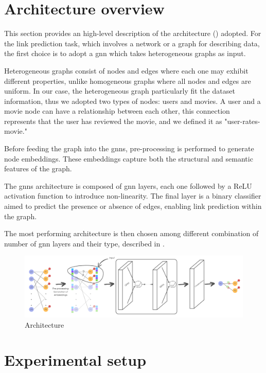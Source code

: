 \documentclass[11pt]{article}
\begin{document}
\section{Architecture overview}\label{sec:architecture-overview}
This section provides an high-level description of the architecture () adopted.
For the link prediction task, which involves a network or a graph for describing data, the first choice is to adopt a \ac{gnn} which takes heterogeneous graphs as input. 

Heterogeneous graphs consist of nodes and edges where each one may exhibit different properties, 
unlike homogeneous graphs where all nodes and edges are uniform.
In our case, the heterogeneous graph particularly fit the dataset information, 
thus we adopted two types of nodes: users and movies.
A user and a movie node can have a relationship between each other, this connection represents that the user has reviewed the movie, and we defined it as "user-rates-movie."

Before feeding the graph into the \acp{gnn}, pre-processing is performed to 
generate node embeddings. 
These embeddings capture both the structural and semantic features of the graph.

The \acp{gnn} architecture is composed of \ac{gnn} layers, each one followed by a ReLU activation 
function to introduce non-linearity. The final layer is a binary classifier 
aimed to predict the presence or absence of edges, enabling link prediction within the 
graph.

The most performing architecture is then chosen among different combination of number of \ac{gnn} layers and their type, described in .


\begin{figure}
  \centering
  \includegraphics[width=1\linewidth]{figures/architecture.pdf}

  \caption{
    Architecture
  }
  \label{fig:architecture}
\end{figure}

\section{Experimental setup}\label{sec:experimental-setup}
\end{document}
